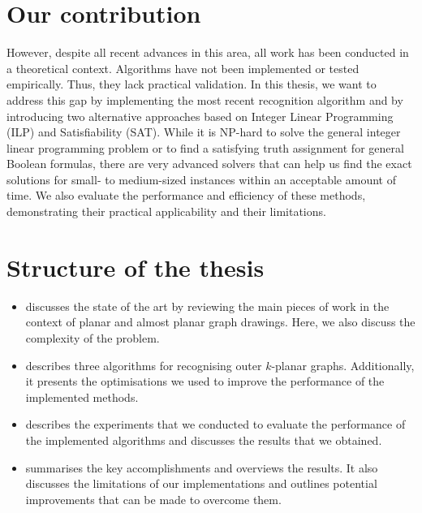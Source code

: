 \section{Our contribution}

However, despite all recent advances in this area, all work has been conducted in a theoretical context. Algorithms have not been implemented or tested empirically. Thus, they lack practical validation. In this thesis, we want to address this gap by implementing the most recent recognition algorithm and by introducing two alternative approaches based on Integer Linear Programming (ILP) and Satisfiability (SAT). While it is NP-hard to solve the general integer linear programming problem or to find a satisfying truth assignment for general Boolean formulas, there are very advanced solvers that can help us find the exact solutions for small- to medium-sized instances within an acceptable amount of time. We also evaluate the performance and efficiency of these methods, demonstrating their practical applicability and their limitations.


\section{Structure of the thesis}

\begin{itemize}
    \item {} discusses the state of the art by reviewing the main pieces of work in the context of planar and almost planar graph drawings. Here, we also discuss the complexity of the problem.
    \item {} describes three algorithms for recognising outer \(k\)-planar graphs. Additionally, it presents the optimisations we used to improve the performance of the implemented methods.
    \item {} describes the experiments that we conducted to evaluate the performance of the implemented algorithms and discusses the results that we obtained.
    \item {} summarises the key accomplishments and overviews the results. It also discusses the limitations of our implementations and outlines potential improvements that can be made to overcome them.
\end{itemize}